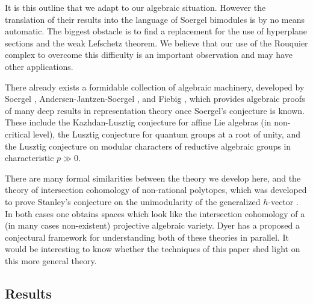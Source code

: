 \documentclass[11pt]{amsart}
\numberwithin{equation}{section}
\theoremstyle{definition}
\theoremstyle{remark}
\begin{document}
It is this outline that we adapt to our algebraic situation. However the translation of their results into the language of Soergel bimodules is by no means automatic. The
biggest obstacle is to find a replacement for the use of hyperplane sections and the weak Lefschetz theorem. We believe that our use of the Rouquier complex to overcome this
difficulty is an important observation and may have other applications.

There already exists a formidable collection of algebraic machinery,
developed by Soergel \cite{S2,S4}, Andersen-Jantzen-Soergel
\cite{AJS}, and Fiebig \cite{F1,F2}, which
provides algebraic proofs of many 
deep results in representation theory once Soergel's conjecture is
known.
These include the Kazhdan-Lusztig conjecture for affine Lie algebras
(in non-critical level), the Lusztig conjecture for quantum groups at
a root of unity, and the Lusztig 
conjecture on modular characters of reductive algebraic groups in
characteristic $p \gg 0$.

There are many formal similarities between the
theory we develop here, and the theory of intersection cohomology of
non-rational polytopes, which was developed to prove Stanley's
conjecture on the unimodularity of the generalized $h$-vector
\cite{BL, K, BBFK}. In both cases one obtains spaces which look like the 
intersection cohomology of a (in many cases non-existent) projective
algebraic variety. Dyer \cite{D1,D2} has a proposed a conjectural framework for
understanding both of these theories in parallel. It would be 
interesting to know whether the techniques of this paper shed light on
this more general theory.


\subsection{Results} \label{sec:results}
\end{document}

